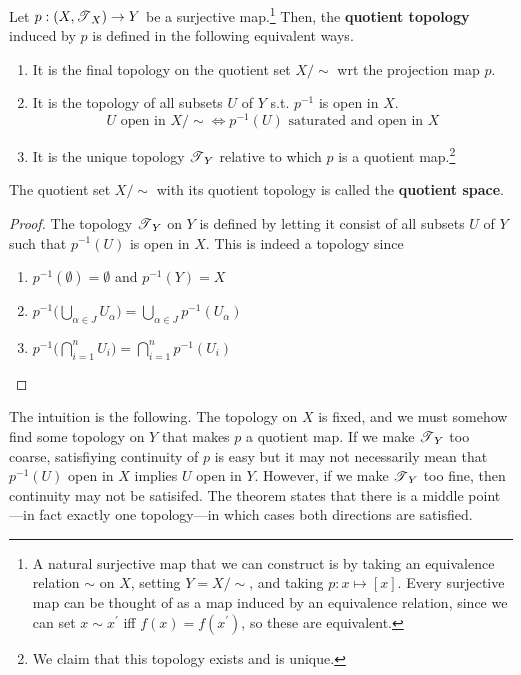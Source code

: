     \begin{definition}
      Let $p: (X, \T_X) \rightarrow Y$ be a surjective map.\footnote{A natural surjective map that we can construct is by taking an equivalence relation $\sim$ on $X$, setting $Y = X/{\sim}$, and taking $p: x \mapsto [x]$. Every surjective map can be thought of as a map induced by an equivalence relation, since we can set $x \sim x^\prime$ iff $f(x) = f(x^\prime)$, so these are equivalent.} Then, the \textbf{quotient topology} induced by $p$ is defined in the following equivalent ways. 
      \begin{enumerate}
        \item It is the final topology on the quotient set $X/{\sim}$ wrt the projection map $p$. 
        \item It is the topology of all subsets $U$ of $Y$ s.t. $p^{-1}$ is open in $X$. 
        \begin{equation}
          U \text{ open in } X/{\sim} \iff p^{-1} (U) \text{ saturated and open in } X
        \end{equation}
        \item It is the unique topology $\T_Y$ relative to which $p$ is a quotient map.\footnote{We claim that this topology exists and is unique.}
      \end{enumerate}
      The quotient set $X/{\sim}$ with its quotient topology is called the \textbf{quotient space}. 
    \end{definition}
    \begin{proof}
      The topology $\T_Y$ on $Y$ is defined by letting it consist of all subsets $U$ of $Y$ such that $p^{-1}(U)$ is open in $X$. This is indeed a topology since
      \begin{enumerate}
        \item $p^{-1} (\emptyset) = \emptyset$ and $p^{-1}(Y) = X$
        \item $p^{-1} \Big( \bigcup_{\alpha \in J} U_\alpha \Big) = \bigcup_{\alpha \in J} p^{-1} (U_\alpha)$
        \item $p^{-1} \Big( \bigcap_{i=1}^n U_i \Big) = \bigcap_{i=1}^n p^{-1} (U_i)$
      \end{enumerate}
    \end{proof}

    The intuition is the following. The topology on $X$ is fixed, and we must somehow find some topology on $Y$ that makes $p$ a quotient map. If we make $\T_Y$ too coarse, satisfiying continuity of $p$ is easy but it may not necessarily mean that $p^{-1}(U)$ open in $X$ implies $U$ open in $Y$. However, if we make $\T_Y$ too fine, then continuity may not be satisifed. The theorem states that there is a middle point---in fact exactly one topology---in which cases both directions are satisfied. 


